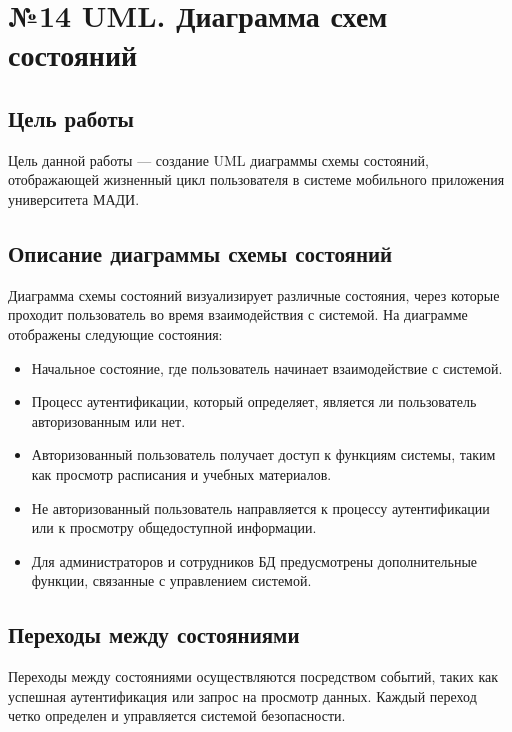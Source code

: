 \documentclass[a4paper,12pt]{article}
\begin{document}
\section{№14 UML. Диаграмма схем состояний}

\subsection{Цель работы}
Цель данной работы — создание UML диаграммы схемы состояний, отображающей жизненный цикл пользователя в системе мобильного приложения университета МАДИ.

\subsection{Описание диаграммы схемы состояний}
Диаграмма схемы состояний визуализирует различные состояния, через которые проходит пользователь во время взаимодействия с системой. На диаграмме отображены следующие состояния:

\begin{itemize}
    \item Начальное состояние, где пользователь начинает взаимодействие с системой.
    \item Процесс аутентификации, который определяет, является ли пользователь авторизованным или нет.
    \item Авторизованный пользователь получает доступ к функциям системы, таким как просмотр расписания и учебных материалов.
    \item Не авторизованный пользователь направляется к процессу аутентификации или к просмотру общедоступной информации.
    \item Для администраторов и сотрудников БД предусмотрены дополнительные функции, связанные с управлением системой.
\end{itemize}

\subsection{Переходы между состояниями}
Переходы между состояниями осуществляются посредством событий, таких как успешная аутентификация или запрос на просмотр данных. Каждый переход четко определен и управляется системой безопасности.
\end{document}
